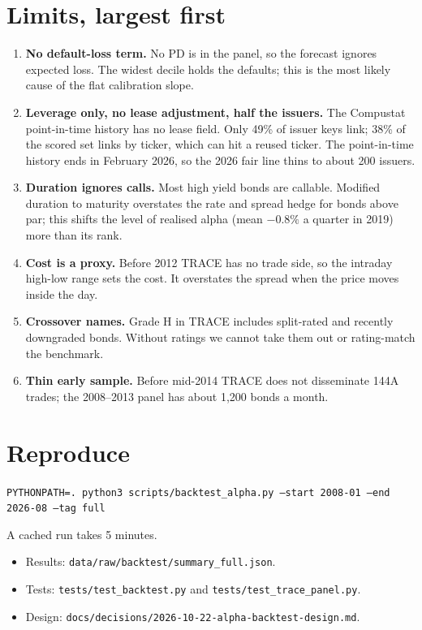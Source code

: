 \documentclass[11pt,a4paper]{article}
\newcommand{\code}[1]{\texttt{\small #1}}
\begin{document}
\section{Limits, largest first}
\begin{enumerate}
\item \textbf{No default-loss term.} No PD is in the panel, so the forecast ignores expected loss. The widest decile holds the defaults; this is the most likely cause of the flat calibration slope.
\item \textbf{Leverage only, no lease adjustment, half the issuers.} The Compustat point-in-time history has no lease field. Only 49\% of issuer keys link; 38\% of the scored set links by ticker, which can hit a reused ticker. The point-in-time history ends in February 2026, so the 2026 fair line thins to about 200 issuers.
\item \textbf{Duration ignores calls.} Most high yield bonds are callable. Modified duration to maturity overstates the rate and spread hedge for bonds above par; this shifts the level of realised alpha (mean $-0.8\%$ a quarter in 2019) more than its rank.
\item \textbf{Cost is a proxy.} Before 2012 TRACE has no trade side, so the intraday high-low range sets the cost. It overstates the spread when the price moves inside the day.
\item \textbf{Crossover names.} Grade H in TRACE includes split-rated and recently downgraded bonds. Without ratings we cannot take them out or rating-match the benchmark.
\item \textbf{Thin early sample.} Before mid-2014 TRACE does not disseminate 144A trades; the 2008--2013 panel has about 1,200 bonds a month.
\end{enumerate}

\section{Reproduce}
\begin{center}\footnotesize\texttt{PYTHONPATH=. python3 scripts/backtest\_alpha.py --start 2008-01 --end 2026-08 --tag full}\end{center}
A cached run takes 5 minutes.
\begin{itemize}
\item Results: \code{data/raw/backtest/summary\_full.json}.
\item Tests: \code{tests/test\_backtest.py} and \code{tests/test\_trace\_panel.py}.
\item Design: \code{docs/decisions/2026-10-22-alpha-backtest-design.md}.
\end{itemize}
\end{document}
